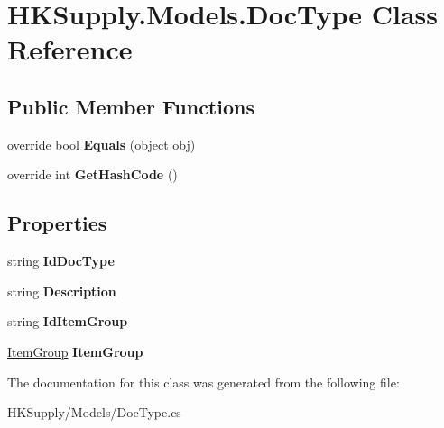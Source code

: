 \hypertarget{class_h_k_supply_1_1_models_1_1_doc_type}{}\section{H\+K\+Supply.\+Models.\+Doc\+Type Class Reference}
\label{class_h_k_supply_1_1_models_1_1_doc_type}
\subsection*{Public Member Functions}
\begin{DoxyCompactItemize}
\item 
\mbox{\label{class_h_k_supply_1_1_models_1_1_doc_type_a77e38eddf91872e81687f1442faba903}} 
override bool {\bfseries Equals} (object obj)
\item 
\mbox{\label{class_h_k_supply_1_1_models_1_1_doc_type_a979b2be536b1c3978514e6217c59c654}} 
override int {\bfseries Get\+Hash\+Code} ()
\end{DoxyCompactItemize}
\subsection*{Properties}
\begin{DoxyCompactItemize}
\item 
\mbox{\label{class_h_k_supply_1_1_models_1_1_doc_type_a168e6a50dba848339deb1038d5d545fa}} 
string {\bfseries Id\+Doc\+Type}
\item 
\mbox{\label{class_h_k_supply_1_1_models_1_1_doc_type_a3553d8105fc7d4d1dd0f4467ba77c3d9}} 
string {\bfseries Description}
\item 
\mbox{\label{class_h_k_supply_1_1_models_1_1_doc_type_a962bce1bcfed5714aede2d18fe78528a}} 
string {\bfseries Id\+Item\+Group}
\item 
\mbox{\label{class_h_k_supply_1_1_models_1_1_doc_type_a9cb617b8fb0c5e0a493037dbe9c6855e}} 
\mbox{\hyperlink{class_h_k_supply_1_1_models_1_1_item_group}{Item\+Group}} {\bfseries Item\+Group}
\end{DoxyCompactItemize}


The documentation for this class was generated from the following file\+:\begin{DoxyCompactItemize}
\item 
H\+K\+Supply/\+Models/Doc\+Type.\+cs\end{DoxyCompactItemize}
